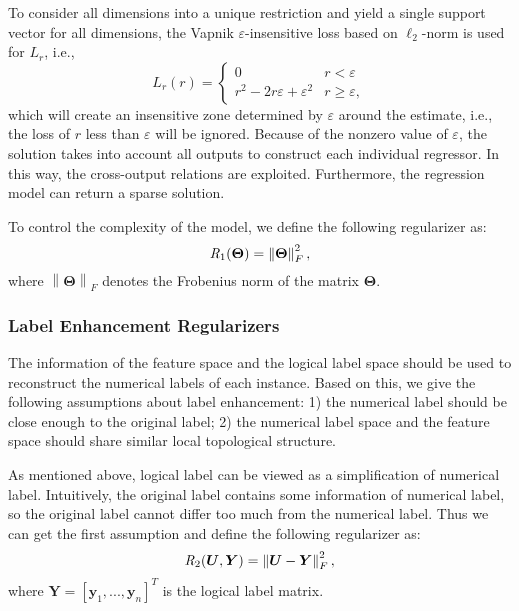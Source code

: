 \documentclass[conference]{IEEEtran}
\begin{document}
To consider all dimensions into a unique restriction and yield a single support vector for all dimensions, the Vapnik $\varepsilon$-insensitive loss based on $\ell_2$-norm is used for $L_r$, i.e.,
\begin{equation}
L_r(r)=
\left\{
     \begin{array}{lr}
     0 &r<\varepsilon\\
     r^2-2r\varepsilon+\varepsilon^2 &r \geq \varepsilon,
     \end{array}
\right.
\end{equation}
which will create an insensitive zone determined by $\varepsilon$ around the estimate, i.e., the loss of $r$ less than $\varepsilon$ will be ignored. Because of the nonzero value of $\varepsilon$, the solution takes into account all outputs to construct each individual regressor. In this way, the cross-output relations are exploited. Furthermore, the regression model can return a sparse solution.

To control the complexity of the model, we define the following regularizer as:
\begin{equation}
\emph{R}_{1}(\bm{\Theta}) = \left\lVert \bm{\Theta} \right\rVert_F^2,
\end{equation}
where $\left\lVert \bm{\Theta} \right\rVert_F$ denotes the Frobenius norm of the matrix $\bm{\Theta}$.

\subsubsection{Label Enhancement Regularizers}
The information of the feature space and the logical label space should be used to reconstruct the numerical labels of each instance. Based on this, we give the following assumptions about label enhancement: 1) the numerical label should be close enough to the original label; 2) the numerical label space and the feature space should share similar local topological structure.

As mentioned above, logical label can be viewed as a simplification of numerical label. Intuitively, the original label contains some information of numerical label, so the original label cannot differ too much from the numerical label. Thus we can get the first assumption and define the following regularizer as:
\begin{equation}
\emph{R}_{2}(\bm{U}, \bm{Y}) = \left\lVert \bm{U} - \bm{Y} \right\rVert_F^2,
\end{equation}
where $\bm{Y}=[\bm{y}_1, ..., \bm{y}_n ]^T$ is the logical label matrix.
\end{document}
